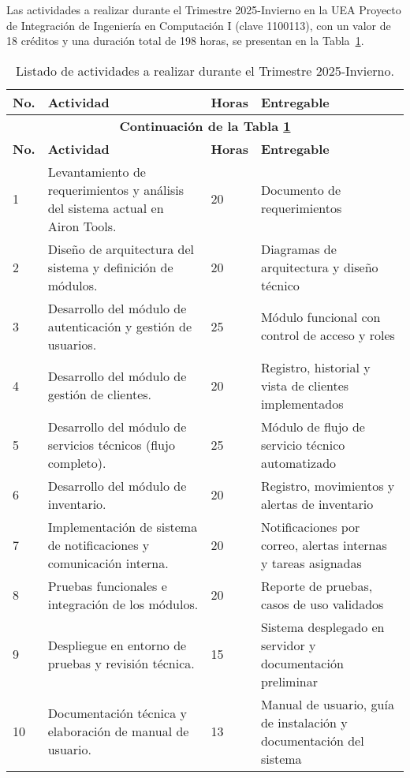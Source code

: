 Las actividades a realizar durante el Trimestre 2025-Invierno en la UEA Proyecto de Integración de Ingeniería en Computación I (clave 1100113), con un valor de 18 créditos y una duración total de 198 horas, se presentan en la Tabla~\ref{table:calendarioActividades}.

\begin{longtable}{p{} p{} p{} p{}}
	\caption{Listado de actividades a realizar durante el Trimestre 2025-Invierno.}
  	\label{table:calendarioActividades}\\
	\toprule
	\textbf{No.} & \textbf{Actividad} & \textbf{Horas} & \textbf{Entregable} \\
	\hline
	\endfirsthead

	\multicolumn{4}{c}{\textbf{Continuación de la Tabla \ref{table:calendarioActividades}}}\\
	\hline
	\textbf{No.} & \textbf{Actividad} & \textbf{Horas} & \textbf{Entregable} \\
	\hline
	\endhead

	\hline
	\endlastfoot

	1 & Levantamiento de requerimientos y análisis del sistema actual en Airon Tools. & 20 & Documento de requerimientos \\
	\midrule

	2 & Diseño de arquitectura del sistema y definición de módulos. & 20 & Diagramas de arquitectura y diseño técnico \\
	\midrule

	3 & Desarrollo del módulo de autenticación y gestión de usuarios. & 25 & Módulo funcional con control de acceso y roles \\
	\midrule

	4 & Desarrollo del módulo de gestión de clientes. & 20 & Registro, historial y vista de clientes implementados \\
	\midrule

	5 & Desarrollo del módulo de servicios técnicos (flujo completo). & 25 & Módulo de flujo de servicio técnico automatizado \\
	\midrule

	6 & Desarrollo del módulo de inventario. & 20 & Registro, movimientos y alertas de inventario \\
	\midrule

	7 & Implementación de sistema de notificaciones y comunicación interna. & 20 & Notificaciones por correo, alertas internas y tareas asignadas \\
	\midrule

	8 & Pruebas funcionales e integración de los módulos. & 20 & Reporte de pruebas, casos de uso validados \\
	\midrule

	9 & Despliegue en entorno de pruebas y revisión técnica. & 15 & Sistema desplegado en servidor y documentación preliminar \\
	\midrule

	10 & Documentación técnica y elaboración de manual de usuario. & 13 & Manual de usuario, guía de instalación y documentación del sistema \\
	\bottomrule
\end{longtable}

